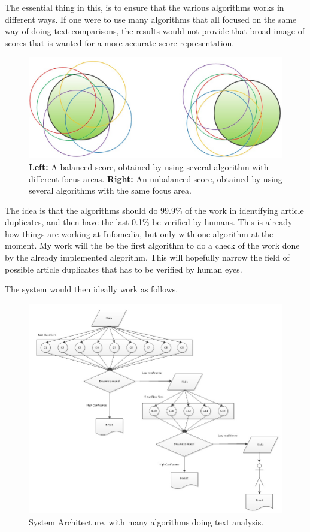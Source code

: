 The essential thing in this, is to ensure that the various algorithms works in different ways. If one were to use many algorithms that all focused on the same way of doing text comparisons, the results would not provide that broad image of scores that is wanted for a more accurate score representation.

\begin{figure}
	\centering
	\includegraphics[scale=0.3]{figures/MultipleAlgoScores}
	\caption{\textbf{Left:} A balanced score, obtained by using several algorithm with different focus areas. \textbf{Right:} An unbalanced score, obtained by using several algorithms with the same focus area\cite{Slides}.}
\end{figure}

The idea is that the algorithms should do 99.9\% of the work in identifying article duplicates, and then have the  last 0.1\% be verified by humans. This is already how things are working at Infomedia, but only with one algorithm at the moment. My work will the be the first algorithm to do a check of the work done by the already implemented algorithm. This will hopefully narrow the field of possible article duplicates that has to be verified by human eyes.

The system would then ideally work as follows.

\begin{figure}[h]
	\centering
	\includegraphics[scale=0.5]{figures/SystemArchitecture}
	\caption{System Architecture, with many algorithms doing text analysis\cite{Slides}.}
	\label{Architecture}
\end{figure}

